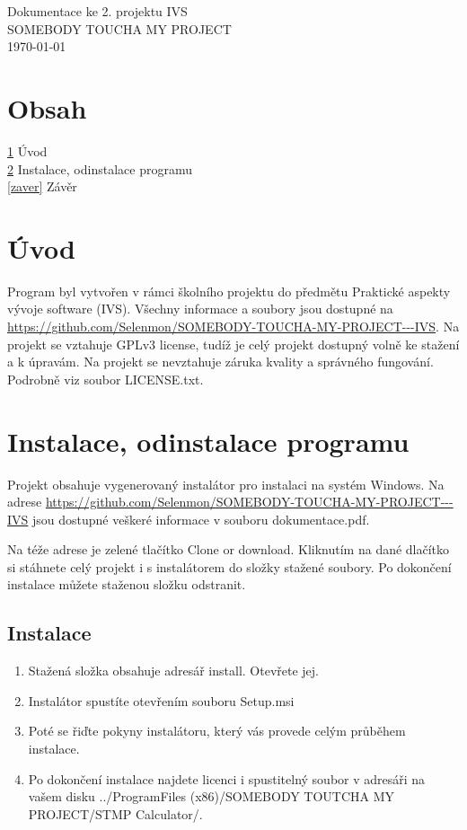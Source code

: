 \documentclass[a4paper, 11pt]{article}
\begin{document}
\begin{center}
\Large{Dokumentace ke 2. projektu IVS\\\medskip}
\normalsize
SOMEBODY TOUCHA MY PROJECT\\\medskip
\today\\\bigskip
\end{center}


\section*{Obsah}
\ref{uvod} \quad Úvod \hfill \pageref{uvod}\medskip \\
\ref{instalace} \quad Instalace, odinstalace programu \hfill \pageref{instalace}\medskip \\
\ref{zaver} \quad Závěr \hfill \pageref{zaver}

\newpage


\section{Úvod}\label{uvod}
Program byl vytvořen v rámci školního projektu do předmětu Praktické aspekty vývoje software (IVS). Všechny informace a soubory jsou dostupné na \url{https://github.com/Selenmon/SOMEBODY-TOUCHA-MY-PROJECT---IVS}. Na projekt se vztahuje GPLv3 license, tudíž je celý projekt dostupný volně ke stažení a k úpravám. Na projekt se nevztahuje záruka kvality a správného fungování. Podrobně viz soubor LICENSE.txt.

\section{Instalace, odinstalace programu}\label{instalace}
Projekt obsahuje vygenerovaný instalátor pro instalaci na systém Windows. Na adrese \url{https://github.com/Selenmon/SOMEBODY-TOUCHA-MY-PROJECT---IVS} jsou dostupné veškeré informace v souboru dokumentace.pdf.\par
Na téže adrese je zelené tlačítko Clone or download. Kliknutím na dané dlačítko si stáhnete celý projekt i s instalátorem do složky stažené soubory. Po dokončení instalace můžete staženou složku odstranit.

\subsection*{Instalace}
\begin{enumerate}
\item Stažená složka obsahuje adresář install. Otevřete jej.
\item Instalátor spustíte otevřením souboru Setup.msi
\item Poté se řiďte pokyny instalátoru, který vás provede celým průběhem instalace.
\item Po dokončení instalace najdete licenci i spustitelný soubor v adresáři na vašem disku ../ProgramFiles (x86)/SOMEBODY TOUTCHA MY PROJECT/STMP Calculator/.
\end{enumerate}
\end{document}
